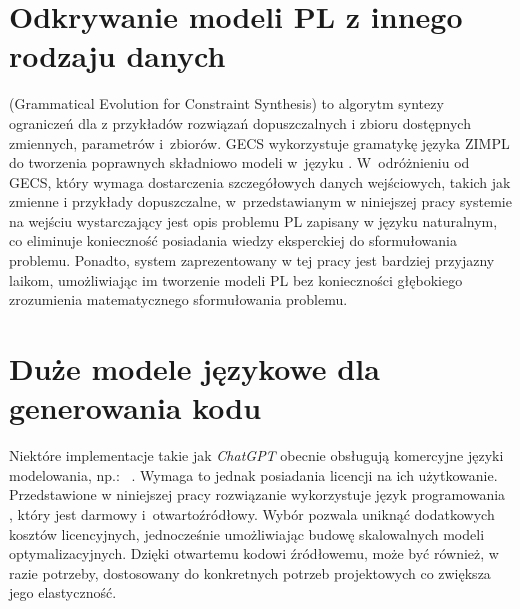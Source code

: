 \section{Odkrywanie modeli PL z innego rodzaju danych}
 (Grammatical Evolution for Constraint Synthesis)  \cite{pawlak2021grammatical} to algorytm syntezy ograniczeń dla  z przykładów rozwiązań dopuszczalnych i zbioru dostępnych zmiennych, parametrów i~zbiorów. GECS wykorzystuje gramatykę języka ZIMPL do tworzenia poprawnych składniowo modeli  w~języku . W~odróżnieniu od GECS, który wymaga dostarczenia szczegółowych danych wejściowych, takich jak zmienne i przykłady dopuszczalne, w~przedstawianym w niniejszej pracy systemie na wejściu wystarczający jest opis problemu PL zapisany w języku naturalnym, co eliminuje konieczność posiadania wiedzy eksperckiej do sformułowania problemu. Ponadto, system zaprezentowany w tej pracy jest bardziej przyjazny laikom, umożliwiając im tworzenie modeli PL bez konieczności głębokiego zrozumienia matematycznego sformułowania problemu.


\section{Duże modele językowe dla generowania kodu}
Niektóre implementacje  takie jak \textit{ChatGPT} obecnie obsługują komercyjne języki modelowania, np.:~ \cite{ampl_chatgpt_guide}. Wymaga to jednak posiadania licencji na ich użytkowanie. 
Przedstawione w niniejszej pracy rozwiązanie wykorzystuje język programowania , który jest darmowy i~otwartoźródłowy. Wybór  pozwala uniknąć dodatkowych kosztów licencyjnych, jednocześnie umożliwiając budowę skalowalnych modeli optymalizacyjnych. Dzięki otwartemu kodowi źródłowemu,  może być również, w razie potrzeby, dostosowany do konkretnych potrzeb projektowych co zwiększa jego elastyczność.







